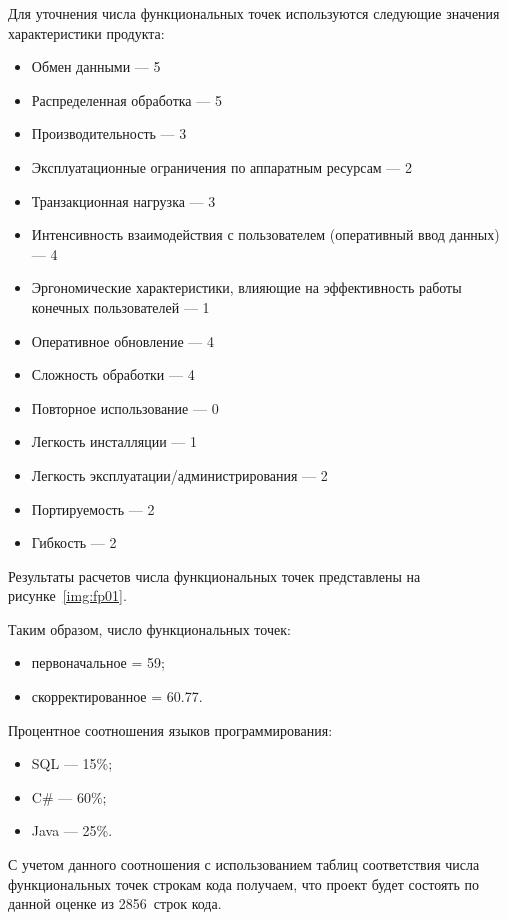 Для уточнения числа функциональных точек используются следующие значения характеристики продукта:

\begin{itemize}
    \item Обмен данными --- 5
    \item Распределенная обработка --- 5
    \item Производительность --- 3
    \item Эксплуатационные ограничения по аппаратным ресурсам --- 2
    \item Транзакционная нагрузка --- 3
    \item Интенсивность взаимодействия с пользователем (оперативный ввод данных) --- 4
    \item Эргономические характеристики, влияющие на эффективность работы конечных пользователей --- 1
    \item Оперативное обновление --- 4
    \item Сложность обработки --- 4
    \item Повторное использование --- 0
    \item Легкость инсталляции --- 1
    \item Легкость эксплуатации/администрирования --- 2
    \item Портируемость --- 2
    \item Гибкость --- 2 
\end{itemize}

Результаты расчетов числа функциональных точек представлены на рисунке~\ref{img:fp01}.


Таким образом, число функциональных точек:

\begin{itemize}
    \item первоначальное = 59;
    \item скорректированное = 60.77.
\end{itemize}

Процентное соотношения языков программирования:

\begin{itemize}
    \item SQL --- 15\%;
    \item C\# --- 60\%;
    \item Java --- 25\%.
\end{itemize}

С учетом данного соотношения с использованием таблиц соответствия числа функциональных точек строкам кода получаем, что проект будет состоять по данной оценке из 2856~строк кода.